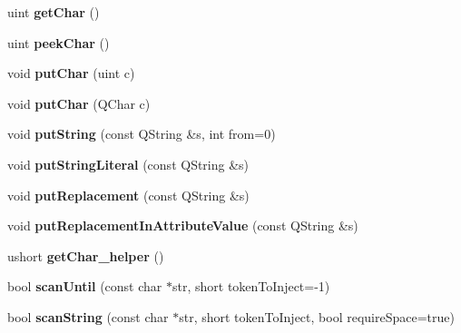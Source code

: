 \begin{DoxyCompactItemize}
uint {\bfseries get\+Char} ()
\item 
\mbox{\label{class_xml_stream_reader_private_a5c421d65c2be4a28ef0bc2b6908db28b}} 
uint {\bfseries peek\+Char} ()
\item 
\mbox{\label{class_xml_stream_reader_private_a5d945b579d818ba81aab019fa4b906cd}} 
void {\bfseries put\+Char} (uint c)
\item 
\mbox{\label{class_xml_stream_reader_private_a7cc6828d20eabc5a91d15413ae278590}} 
void {\bfseries put\+Char} (Q\+Char c)
\item 
\mbox{\label{class_xml_stream_reader_private_a16ab254336bfbc816836d3d75bdebc41}} 
void {\bfseries put\+String} (const Q\+String \&s, int from=0)
\item 
\mbox{\label{class_xml_stream_reader_private_aa3b3d56ef5b157de87c444bed3c2f982}} 
void {\bfseries put\+String\+Literal} (const Q\+String \&s)
\item 
\mbox{\label{class_xml_stream_reader_private_a5ac6f45d89a7e9cacc86e55d70f0a281}} 
void {\bfseries put\+Replacement} (const Q\+String \&s)
\item 
\mbox{\label{class_xml_stream_reader_private_a00beba8b0199f6ba93d9d7f076ee75a9}} 
void {\bfseries put\+Replacement\+In\+Attribute\+Value} (const Q\+String \&s)
\item 
\mbox{\label{class_xml_stream_reader_private_a1f0240873ecb821fb5470cfd60a843ba}} 
ushort {\bfseries get\+Char\+\_\+helper} ()
\item 
\mbox{\label{class_xml_stream_reader_private_ab8432f84f715cf42214ddbf78fa5ed3e}} 
bool {\bfseries scan\+Until} (const char $\ast$str, short token\+To\+Inject=-\/1)
\item 
\mbox{\label{class_xml_stream_reader_private_af08a52fdc7afd046d3f0537c8bc65bfe}} 
bool {\bfseries scan\+String} (const char $\ast$str, short token\+To\+Inject, bool require\+Space=true)

\end{DoxyCompactItemize}
